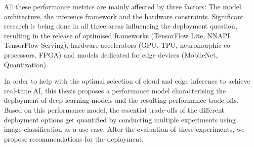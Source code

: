 All these performance metrics are mainly affected by three factors: The model architecture, the inference framework and the hardware constraints.
Significant research is being done in all three areas influencing the deployment question, resulting in the release of optimised frameworks (TensorFlow Lite, NNAPI, TensorFlow Serving), hardware accelerators (GPU, TPU, neuromorphic co-processors, FPGA) and models dedicated for edge devices (MobileNet, Quantization).


In order to help with the optimal selection of cloud and edge inference to achieve real-time AI, this thesis proposes a performance model characterising the deployment of deep learning models and the resulting performance trade-offs.
Based on this performance model, the essential trade-offs of the different deployment options get quantified by conducting multiple experiments using image classification as a use case. After the evaluation of these experiments, we propose recommendations for the deployment.




